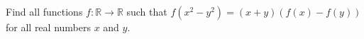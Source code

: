 \documentclass[varwidth]{standalone}
\begin{document}
    Find all functions $f: \mathbb{R} \to \mathbb{R}$ such that $f(x^2 - y^2) = (x + y)(f(x) - f(y))$ for all real numbers $x$ and $y$.
\end{document}
